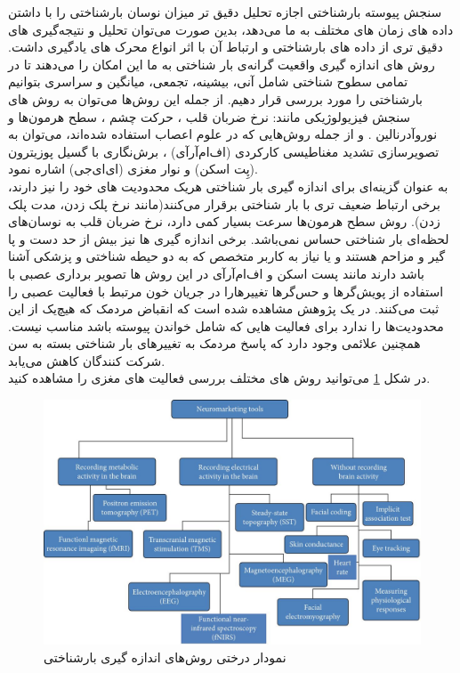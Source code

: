 سنجش پیوسته بارشناختی اجازه تحلیل دقیق تر میزان نوسان بارشناختی را با داشتن داده های زمان های مختلف به ما می‌دهد، بدین صورت می‌توان تحلیل و نتیجه‌گیری های دقیق تری از داده های بارشناختی و ارتباط آن با اثر انواع محرک های یادگیری داشت. روش های اندازه گیری واقعیت گرانه‌ی بار شناختی به ما این امکان را می‌دهند تا در تمامی سطوح شناختی شامل آنی، بیشینه، تجمعی، میانگین و سراسری بتوانیم بارشناختی را مورد بررسی قرار دهیم. از جمله این روش‌ها می‌توان به روش های سنجش  فیزیولوژیکی مانند: نرخ ضربان قلب
، حرکت چشم
، سطح هرمون‌ها
و نوروآدرنالین
.
و از جمله روش‌هایی که در علوم اعصاب استفاده شده‌اند، می‌توان به تصویرسازی تشدید مغناطیسی کارکردی (اف‌ام‌آرآی)
، برش‌نگاری با گسیل پوزیترون (پِت اسکن)
و نوار مغزی (ای‌ای‌جی)
اشاره نمود.
\cite{antonenko2010using}
\\
به عنوان گزینه‌ای برای اندازه گیری بار شناختی هریک محدودیت های خود را نیز دارند، برخی ارتباط ضعیف تری با بار شناختی برقرار می‌کنند(مانند نرخ پلک زدن، مدت پلک زدن). روش سطح هرمون‌ها سرعت بسیار کمی دارد، نرخ ضربان قلب به نوسان‌های لحظه‌ای بار شناختی حساس نمی‌باشد. برخی اندازه گیری ها نیز بیش از حد دست و پا گیر و مزاحم هستند و یا نیاز به کاربر متخصص که به دو حیطه شناختی و پزشکی آشنا باشد دارند مانند پست اسکن و اف‌ام‌آرآی در این روش ها تصویر برداری عصبی با استفاده از پویش‌گرها و حس‌گرها تغییرها‌را در جریان خون مرتبط با فعالیت عصبی را ثبت می‌کنند. در یک پژوهش مشاهده شده است که انقباض مردمک که هیچ‌یک از این محدودیت‌ها را ندارد برای فعالیت هایی که شامل خواندن پیوسته باشد مناسب نیست. همچنین علائمی وجود دارد که پاسخ مردمک به تغییرهای بار شناختی بسته به سن شرکت کنندگان کاهش می‌یابد.
\cite{antonenko2010using}
\\
در شکل 
\ref{fig:neuromarketingtools}
می‌توانید روش های مختلف بررسی فعالیت های مغزی را مشاهده کنید.
\begin{figure}[htbp]
	\centering
	\includegraphics[width=\linewidth]{figures/Neuromarketing_tools}
	\caption[نمودار درختی روش‌های اندازه‌گیری بارشناختی]{نمودار درختی روش‌های اندازه گیری بارشناختی}
	\label{fig:neuromarketingtools}
\end{figure}


